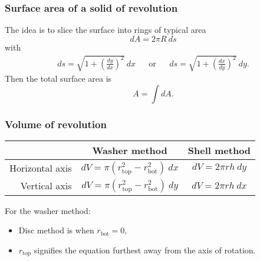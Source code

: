 \documentclass[main.tex]{subfiles}
\begin{document}
	\subsubsection*{Surface area of a solid of revolution}
	The idea is to slice the surface into rings of typical area \[dA = 2 \pi R \ ds\] with
	\begin{align*}
		ds = \sqrt{1 + \left(\frac{dy}{dx}\right)^2} \ dx && \text{or} && ds = \sqrt{1 + \left(\frac{dx}{dy}\right)^2} \ dy.
	\end{align*}
	Then the total surface area is \[A = \int dA.\]

	\subsubsection*{Volume of revolution}
	\begin{tabular}{r c c}
		\toprule
		{} & Washer method & Shell method \\ \hline
		Horizontal axis & \(\displaystyle dV = \pi (r^2_{\mathrm{top}} - r^2_{\mathrm{bot}}) \ dx\) & \(\displaystyle dV = 2 \pi rh \ dy\) \\ \hline
		Vertical axis & \(\displaystyle dV = \pi (r^2_{\mathrm{top}} - r^2_{\mathrm{bot}}) \ dy\) & \(\displaystyle dV = 2 \pi rh \ dx\) \\
		\bottomrule
	\end{tabular}

	For the washer method:
	\begin{itemize}
		\item Disc method is when \(\displaystyle r_\mathrm{bot} = 0\),
		\item \(r_\mathrm{top}\) signifies the equation furthest away from the axis of rotation.
	\end{itemize}


\ifSubfilesClassLoaded{%
\end{multicols}
}{}
\end{document}

